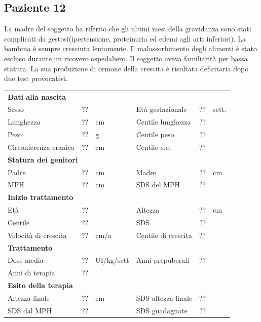 \subsection*{Paziente 12}%

La madre del soggetto ha riferito che gli ultimi mesi della gravidanza sono stati complicati da gestosi(ipertensione, proteinuria ed edemi agli arti inferiori). La bambina è sempre cresciuta lentamente. Il malassorbimento degli alimenti è stato escluso durante un ricovero ospedaliero. Il soggetto aveva familiarità per bassa statura. La sua produzione di ormone della crescita è risultata deficitaria dopo due test provocativi. 

\begin{table}[!h]
\begin{tabular}{lrllrl}
\toprule
\multicolumn{6}{l}{\textbf{Dati alla nascita}}\\
Sesso 		& \multicolumn{2}{l}{??} 	& Età gestazionale 		& ?? 		& sett.\\
Lunghezza 	& ?? 		& cm 				& Centile lunghezza		& ?? 		\\
Peso 		& ?? 		& g					& Centile peso			& ?? 		\\
Circonferenza cranica	& ?? 		& cm 	& Centile c.c.			& ?? \\
\midrule
\multicolumn{6}{l}{\textbf{Statura dei genitori}}\\
Padre 		& ?? & cm 	& Madre 				& ?? & cm \\
MPH 		& ?? & cm 	& SDS del MPH 			& ??\\
\midrule
\multicolumn{6}{l}{\textbf{Inizio trattamento}} \\
Età	& ?? & 		& Altezza 				& ?? & cm  \\
Centile & ?? 	 &		& SDS		& ?? \\
Velocità di crescita & ?? & cm/a	& Centile di crescita & ??\\
\midrule
\multicolumn{6}{l}{\textbf{Trattamento}} \\
Dose media		& ?? & UI/kg/sett & Anni prepuberali & ??\\
Anni di terapia & ??\\
\midrule
\multicolumn{6}{l}{\textbf{Esito della terapia}} \\
Altezza finale			& ?? & cm 	& SDS altezza finale		& ??\\
SDS dal MPH				& ?? &		& SDS guadagnate 			& ??\\
\bottomrule
\end{tabular}
\end{table}
\clearpage


